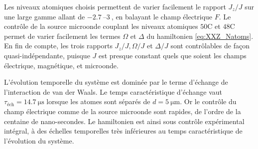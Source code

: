 Les niveaux atomiques choisis permettent de varier facilement le rapport $J_z/J$ sur une large gamme allant de $\SIrange{-2.7}{+3}{}$, en balayant le champ électrique $F$.
Le contrôle de la source microonde couplant les niveaux atomiques $\mathrm{50C}$ et $\mathrm{48C}$ permet de varier facilement les termes $\Omega$ et $\Delta$ du hamiltonien \eqref{eq:XXZ_Natoms}.
En fin de compte, les trois rapports $J_z/J, \Omega/J$ et $\Delta/J$ sont contrôlables de façon quasi-indépendante, puisque $J$ est presque constant quels que soient les champs électrique, magnétique, et microonde.

L'évolution temporelle du système est dominée par le terme d'échange de l'interaction de van der Waals.
Le temps caractéristique d'échange vaut $\tau_{\text{\'ech}} = \SI{14.7}{\us}$ lorsque les atomes sont séparés de $d=\SI{5}{\um}$.
Or le contrôle du champ électrique comme de la source microonde sont rapides, de l'ordre de la centaine de nano-secondes.
Le hamiltonien est ainsi sous contrôle expérimental intégral, à des échelles temporelles très inférieures au temps caractéristique de l'évolution du système.

